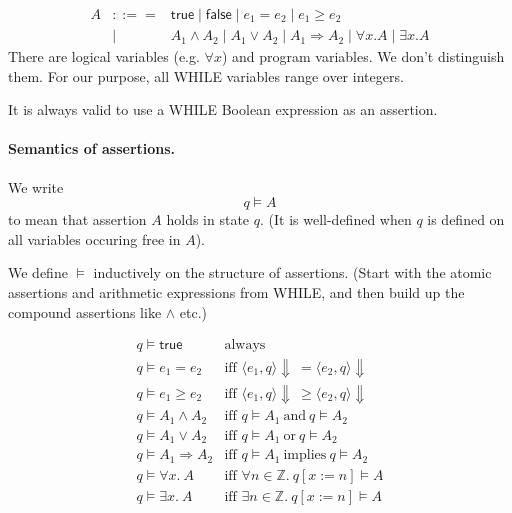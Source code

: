 \documentclass[11pt]{article}
\newcommand{\sem}[3]{\langle #1, #2 \rangle \Downarrow #3}
\begin{document}
\begin{eqnarray*}
  A &::==& \mathsf{true} \mid \mathsf{false} \mid e_1 = e_2 \mid e_1 \geq e_2 \\
  &\mid& A_1 \wedge A_2 \mid A_1 \vee A_2 \mid A_1 \Rightarrow A_2 \mid \forall x. A \mid \exists x. A
\end{eqnarray*}
There are logical variables (e.g. $\forall x$) and program variables.
We don't distinguish them. For our purpose, all WHILE variables range over integers.

It is always valid to use a WHILE Boolean expression as an assertion.

\paragraph{Semantics of assertions.}
We write
\[ q \models A \]
to mean that assertion $A$ holds in state $q$.
(It is well-defined when $q$ is defined on all variables occuring free in $A$).

We define $\models$ inductively on the structure of assertions. (Start with the atomic assertions
and arithmetic expressions from WHILE, and then build up the compound assertions like $\wedge$ etc.)

\[
\begin{array}{ll}
  q \models \mathsf{true} & \mbox{always} \\
  q \models e_1 = e_2 &    \mbox{iff~} \sem{e_1}{q}{}~ = \sem{e_2}{q}{} \\
  q \models e_1 \geq e_2 & \mbox{iff~} \sem{e_1}{q}{}~ \geq \sem{e_2}{q}{} \\
  q \models A_1 \wedge A_2 & \mbox{iff~} q \models A_1 \mathrm{~and~} q \models A_2 \\
  q \models A_1 \vee A_2 & \mbox{iff~} q \models A_1 \mathrm{~or~} q \models A_2 \\
  q \models A_1 \Rightarrow A_2 & \mbox{iff~} q \models A_1 \mathrm{~implies~} q \models A_2 \\
  q \models \forall x.~ A & \mbox{iff~} \forall n \in \mathbb{Z}.~q[x:=n] \models A\\
  q \models \exists x.~ A & \mbox{iff~} \exists n \in \mathbb{Z}.~q[x:=n] \models A\\
\end{array}
\]
  
\end{document}
